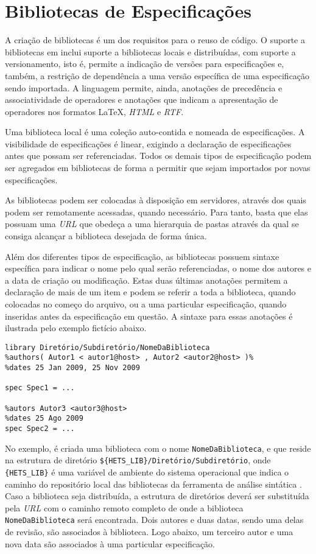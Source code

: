 \section{Bibliotecas de Especificações}
A criação de bibliotecas é um dos requisitos para o reuso de código.
O suporte a bibliotecas em \CASL inclui suporte a bibliotecas locais e distribuídas, com suporte a versionamento, isto é, permite a indicação de versões para especificações e, também, a restrição de dependência a uma versão específica de uma especificação sendo importada.
A linguagem permite, ainda, anotações de precedência e associatividade de operadores e anotações que indicam a apresentação de operadores nos formatos \LaTeX, \textit{HTML} e \textit{RTF}.

Uma biblioteca local é uma coleção auto-contida e nomeada de especificações.
A visibilidade de especificações é linear, exigindo a declaração de especificações antes que possam ser referenciadas.
Todos os demais tipos de especificação podem ser agregados em bibliotecas de forma a permitir que sejam importados por novas especificações.

As bibliotecas podem ser colocadas à disposição em servidores, através dos quais podem ser remotamente acessadas, quando necessário.
Para tanto, basta que elas possuam uma \textit{URL} que obedeça a uma hierarquia de pastas através da qual se consiga alcançar a biblioteca desejada de forma única.

Além dos diferentes tipos de especificação, as bibliotecas possuem sintaxe específica para indicar o nome pelo qual serão referenciadas, o nome dos autores e a data de criação ou modificação.
Estas duas últimas anotações permitem a declaração de mais de um item e podem se referir a toda a biblioteca, quando colocadas no começo do arquivo, ou a uma particular especificação, quando inseridas antes da especificação em questão.
A sintaxe para essas anotações é ilustrada pelo exemplo fictício abaixo.
\begin{Verbatim}
library Diretório/Subdiretório/NomeDaBiblioteca
%authors( Autor1 < autor1@host> , Autor2 <autor2@host> )%
%dates 25 Jan 2009, 25 Nov 2009

spec Spec1 = ...

%autors Autor3 <autor3@host>
%dates 25 Ago 2009
spec Spec2 = ...
\end{Verbatim}

No exemplo, é criada uma biblioteca com o nome \Verb.NomeDaBiblioteca., e que reside na estrutura de diretório \Verb.${HETS_LIB}/Diretório/Subdiretório., onde \Verb.{HETS_LIB}. é uma variável de ambiente do sistema operacional que indica o caminho do repositório local das bibliotecas da ferramenta de análise sintática \Hets.
Caso a biblioteca seja distribuída, a estrutura de diretórios deverá ser substituída pela \textit{URL} com o caminho remoto completo de onde a biblioteca \Verb.NomeDaBiblioteca. será encontrada.
Dois autores e duas datas, sendo uma delas de revisão, são associados à biblioteca.
Logo abaixo, um terceiro autor e uma nova data são associados à uma particular especificação.

